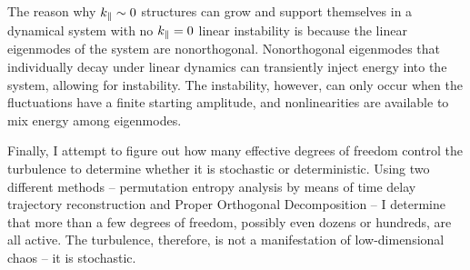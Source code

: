 {The reason why $k_\parallel \sim 0$ structures can grow and support themselves in a dynamical system with no $k_\parallel = 0$ linear instability is because the linear eigenmodes of the
system are nonorthogonal. Nonorthogonal eigenmodes that individually decay under linear dynamics can transiently inject energy into the system, allowing for instability.
The instability, however, can only occur when the fluctuations have a finite starting amplitude, and nonlinearities are available to mix energy among eigenmodes.

Finally, I attempt to figure out how many effective degrees of freedom control the turbulence to determine whether it is stochastic or deterministic. 
Using two different methods -- permutation entropy analysis by means of time delay trajectory reconstruction and Proper Orthogonal Decomposition -- I determine that
more than a few degrees of freedom, possibly even dozens or hundreds, are all active. The turbulence, therefore, is not a manifestation of low-dimensional chaos -- it is stochastic.
}
